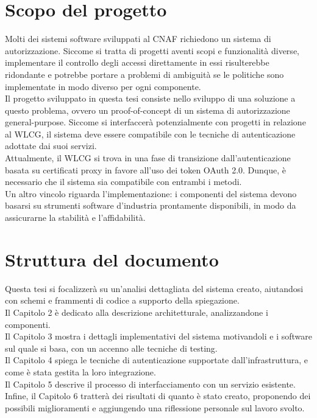 \section{Scopo del progetto}
Molti dei sistemi software sviluppati al CNAF richiedono un sistema di autorizzazione. Siccome si tratta di progetti aventi scopi e funzionalità diverse,
implementare 
il controllo degli accessi direttamente in essi risulterebbe ridondante e potrebbe portare a problemi di ambiguità 
se le politiche sono implementate in modo diverso per ogni componente.
\\ Il progetto sviluppato in questa tesi consiste nello sviluppo di una soluzione a questo problema, ovvero un proof-of-concept di 
un sistema di autorizzazione general-purpose. Siccome si interfaccerà potenzialmente con progetti in relazione al WLCG, il sistema deve essere compatibile
 con le tecniche di autenticazione adottate dai suoi servizi.
\\ Attualmente, il WLCG si trova in una fase di transizione dall'autenticazione basata su certificati proxy in favore all'uso dei token OAuth 2.0.
 Dunque, è necessario che il sistema sia compatibile con entrambi i metodi. 
\\Un altro vincolo riguarda l'implementazione: i componenti del sistema devono basarsi su strumenti software d'industria prontamente disponibili,
 in modo da assicurarne 
la stabilità e l'affidabilità.  

\section{Struttura del documento}
Questa tesi si focalizzerà su un'analisi dettagliata del sistema creato, aiutandosi con schemi e frammenti 
di codice a supporto della spiegazione.
\\ Il Capitolo 2 è dedicato alla descrizione architetturale, analizzandone i componenti. 
\\ Il Capitolo 3 mostra i dettagli implementativi del sistema motivandoli e i software sul quale si basa, con un accenno alle tecniche di testing. 
\\ Il Capitolo 4 spiega le tecniche di autenticazione supportate dall'infrastruttura, e come è stata gestita la loro integrazione.  
\\ Il Capitolo 5 descrive il processo di interfacciamento con un servizio esistente. 
\\ Infine, il Capitolo 6 tratterà dei risultati di quanto è stato creato, proponendo 
dei possibili miglioramenti e aggiungendo una riflessione personale sul lavoro svolto. 